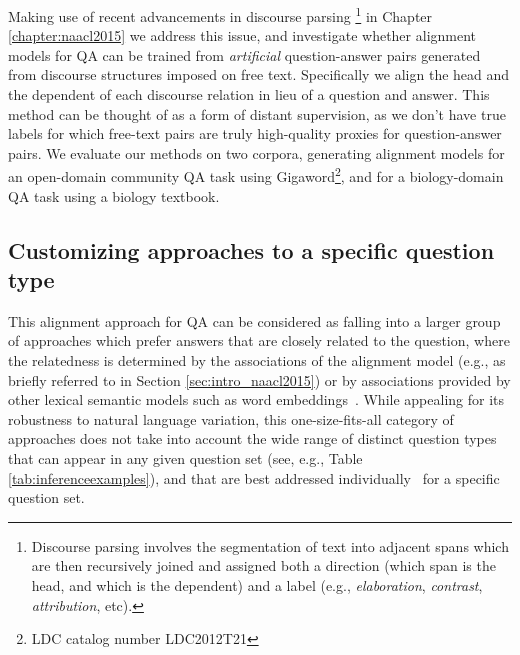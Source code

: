 Making use of recent advancements in discourse parsing \citep{feng12}\footnote{Discourse parsing involves the segmentation of text into adjacent spans which are then recursively joined and assigned both a direction (which span is the head, and which is the dependent) and a label (e.g., \emph{elaboration}, \emph{contrast}, \emph{attribution}, etc).}  
in Chapter \ref{chapter:naacl2015} we address this issue, and investigate whether alignment models for QA can be trained from \emph{artificial} question-answer pairs generated from discourse structures  imposed on free text.  Specifically we align the head and the dependent of each discourse relation in lieu of a question and answer. 
This method can be thought of as a form of distant supervision, as we don't have true labels for which free-text pairs are truly high-quality proxies for question-answer pairs.
We evaluate our methods on two corpora, generating alignment models for an open-domain community QA task using Gigaword\footnote{LDC catalog number LDC2012T21}, and for a biology-domain QA task using a biology textbook. 


\subsection{Customizing approaches to a specific question type}
\label{sec:intro_emnlp2016}

This alignment approach for QA can be considered as falling into a larger group of approaches which prefer answers that are closely related to the question, where the relatedness is determined by the associations of the alignment model (e.g., as briefly referred to in Section \ref{sec:intro_naacl2015}) or by associations provided by other lexical semantic models such as word embeddings~\citep{yih13,jansen14,fried2015higher}. 
While appealing for its robustness to natural language variation, this one-size-fits-all category of approaches does not take into account the wide range of distinct question types that can appear in any given question set (see, e.g.,  Table \ref{tab:inferenceexamples}), and that are best addressed individually~\citep{chu2004ibm,ferrucci2010building,clark2013study} for a specific question set.  

